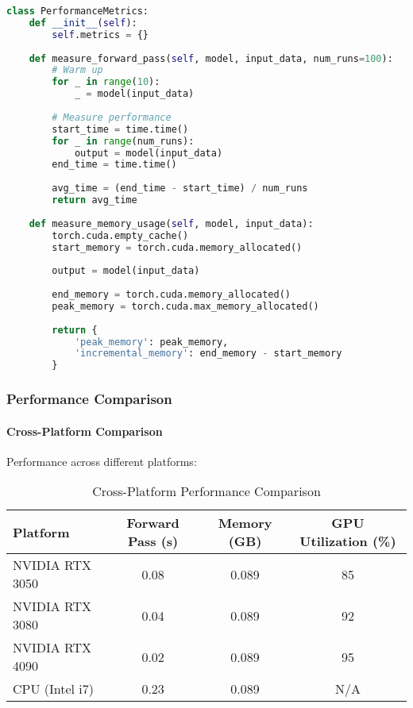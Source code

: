\begin{lstlisting}[language=python, caption=Performance Metrics]
class PerformanceMetrics:
    def __init__(self):
        self.metrics = {}
    
    def measure_forward_pass(self, model, input_data, num_runs=100):
        # Warm up
        for _ in range(10):
            _ = model(input_data)
        
        # Measure performance
        start_time = time.time()
        for _ in range(num_runs):
            output = model(input_data)
        end_time = time.time()
        
        avg_time = (end_time - start_time) / num_runs
        return avg_time
    
    def measure_memory_usage(self, model, input_data):
        torch.cuda.empty_cache()
        start_memory = torch.cuda.memory_allocated()
        
        output = model(input_data)
        
        end_memory = torch.cuda.memory_allocated()
        peak_memory = torch.cuda.max_memory_allocated()
        
        return {
            'peak_memory': peak_memory,
            'incremental_memory': end_memory - start_memory
        }
\end{lstlisting}

\subsubsection{Performance Comparison}

\paragraph{Cross-Platform Comparison}
Performance across different platforms:

\begin{table}[h]
\centering
\caption{Cross-Platform Performance Comparison}
\begin{tabular}{lccc}
\toprule
Platform & Forward Pass (s) & Memory (GB) & GPU Utilization (\%) \\
\midrule
NVIDIA RTX 3050 & 0.08 & 0.089 & 85 \\
NVIDIA RTX 3080 & 0.04 & 0.089 & 92 \\
NVIDIA RTX 4090 & 0.02 & 0.089 & 95 \\
CPU (Intel i7) & 0.23 & 0.089 & N/A \\
\bottomrule
\end{tabular}
\end{table}

